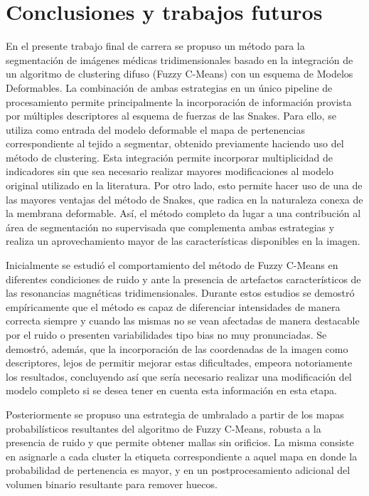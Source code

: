 \chapter{Conclusiones y trabajos futuros}\label{chap:conclusiones}
En el presente trabajo final de carrera se propuso un método para la segmentación de imágenes médicas tridimensionales basado en la integración de un algoritmo de clustering difuso (Fuzzy C-Means) con un esquema de Modelos Deformables. La combinación de ambas estrategias en un único pipeline de procesamiento permite principalmente la incorporación de información provista por múltiples descriptores al esquema de fuerzas de las Snakes. Para ello, se utiliza como entrada del modelo deformable el mapa de pertenencias correspondiente al tejido a segmentar, obtenido previamente haciendo uso del método de clustering. Esta integración permite incorporar multiplicidad de indicadores sin que sea necesario realizar mayores modificaciones al modelo original utilizado en la literatura. Por otro lado, esto permite hacer uso de una de las mayores ventajas del método de Snakes, que radica en la naturaleza conexa de la membrana deformable. Así, el método completo da lugar a una contribución al área de segmentación no supervisada que complementa ambas estrategias y realiza un aprovechamiento mayor de las características disponibles en la imagen.

Inicialmente se estudió el comportamiento del método de Fuzzy C-Means en diferentes condiciones de ruido y ante la presencia de artefactos característicos de las resonancias magnéticas tridimensionales. Durante estos estudios se demostró empíricamente que el método es capaz de diferenciar intensidades de manera correcta siempre y cuando las mismas no se vean afectadas de manera destacable por el ruido o presenten variabilidades tipo bias no muy pronunciadas. Se demostró, además, que la incorporación de las coordenadas de la imagen como descriptores, lejos de permitir mejorar estas dificultades, empeora notoriamente los resultados, concluyendo así que sería necesario realizar una modificación del modelo completo si se desea tener en cuenta esta información en esta etapa.

Posteriormente se propuso una estrategia de umbralado a partir de los mapas probabilísticos resultantes del algoritmo de Fuzzy C-Means, robusta a la presencia de ruido y que permite obtener mallas sin orificios. La misma consiste en asignarle a cada cluster la etiqueta correspondiente a aquel mapa en donde la probabilidad de pertenencia es mayor, y en un postprocesamiento adicional del volumen binario resultante para remover huecos.

